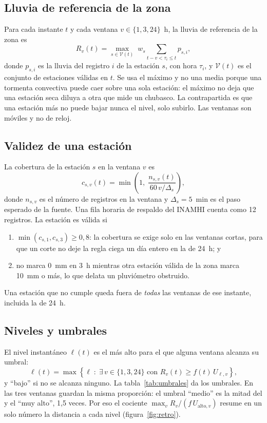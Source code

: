 \documentclass{sosg-informe}
\begin{document}
\subsection{Lluvia de referencia de la zona}
Para cada instante $t$ y cada ventana $v \in \{1, 3, 24\}$~h, la lluvia de referencia de la zona es
\begin{equation}\label{eq:R}
  R_v(t) = \max_{s \in \mathcal{V}(t)} \; w_s \sum_{t - v < \tau_i \leq t} p_{s,i},
\end{equation}
donde $p_{s,i}$ es la lluvia del registro $i$ de la estación $s$, con hora $\tau_i$, y $\mathcal{V}(t)$ es el conjunto de estaciones válidas en $t$. Se usa el máximo y no una media porque una tormenta convectiva puede caer sobre una sola estación: el máximo no deja que una estación seca diluya a otra que mide un chubasco. La contrapartida es que una estación más no puede bajar nunca el nivel, solo subirlo. Las ventanas son móviles y no de reloj.

\subsection{Validez de una estación}
La cobertura de la estación $s$ en la ventana $v$ es
\begin{equation}\label{eq:cob}
  c_{s,v}(t) = \min\!\left(1,\; \frac{n_{s,v}(t)}{60\,v/\Delta_s}\right),
\end{equation}
donde $n_{s,v}$ es el número de registros en la ventana y $\Delta_s = 5$~min es el paso esperado de la fuente. Una fila horaria de respaldo del INAMHI cuenta como 12 registros. La estación es válida si
\begin{enumerate}
  \item $\min(c_{s,1}, c_{s,3}) \geq 0{,}8$: la cobertura se exige solo en las ventanas cortas, para que un corte no deje la regla ciega un día entero en la de 24~h; y
  \item no marca 0~mm en 3~h mientras otra estación válida de la zona marca 10~mm o más, lo que delata un pluviómetro obstruido.
\end{enumerate}
Una estación que no cumple queda fuera de \emph{todas} las ventanas de ese instante, incluida la de 24~h.

\subsection{Niveles y umbrales}
El nivel instantáneo $\ell(t)$ es el más alto para el que alguna ventana alcanza su umbral:
\begin{equation}\label{eq:nivel}
  \ell(t) = \max\left\{\ell \;:\; \exists\, v \in \{1,3,24\} \text{ con } R_v(t) \geq f(t)\, U_{\ell,v}\right\},
\end{equation}
y \enquote{bajo} si no se alcanza ninguno. La tabla~\ref{tab:umbrales} da los umbrales. En las tres ventanas guardan la misma proporción: el umbral \enquote{medio} es la mitad del \alto{} y el \enquote{muy alto}, 1,5 veces. Por eso el cociente $\max_v R_v/(f\,U_{\text{alto},v})$ resume en un solo número la distancia a cada nivel (figura~\ref{fig:retro}).
\end{document}
